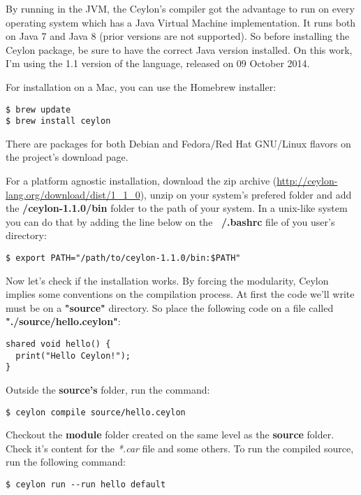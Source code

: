 \documentclass{abnt}
\begin{document}
By running in the JVM, the Ceylon's compiler got the advantage to run
on every operating system which has a Java Virtual Machine implementation. It  
runs both on Java 7 and Java 8 (prior versions are not supported). So before
installing the Ceylon package, be sure to have the correct Java version
installed. On this work, I'm using the 1.1 version of the language, released on
09 October 2014.

For installation on a Mac, you can use the Homebrew installer:

\begin{verbatim}
$ brew update
$ brew install ceylon
\end{verbatim}

There are packages for both Debian and Fedora/Red Hat GNU/Linux flavors on the
project's download page\cite{1_10}.

For a platform agnostic installation, download the zip archive
(\url{http://ceylon-lang.org/download/dist/1_1_0}),
unzip on your system's prefered folder and add the \textbf{/ceylon-1.1.0/bin}
folder to the path of your system. In a unix-like system you can do that by
adding the line below on the \textbf{~/.bashrc} file of you user's directory:

\begin{verbatim}
$ export PATH="/path/to/ceylon-1.1.0/bin:$PATH"
\end{verbatim}

Now let's check if the installation works. By forcing the modularity, Ceylon
implies some conventions on the compilation process. At first the code we'll
write must be on a \textbf{"source"} directory. So place the following code on a
file called \textbf{"./source/hello.ceylon"}:

\begin{lstlisting}[label=hello,caption=Ceylon Hello World]
shared void hello() {
  print("Hello Ceylon!");
}
\end{lstlisting}

Outside the \textbf{source's} folder, run the command:

\begin{verbatim}
$ ceylon compile source/hello.ceylon
\end{verbatim}

Checkout the \textbf{module} folder created on the same level as the 
\textbf{source} folder. Check it's content for the \textit{*.car} file and some
others. To run the compiled source, run the following command:

\begin{verbatim}
$ ceylon run --run hello default
\end{verbatim}
\end{document}
